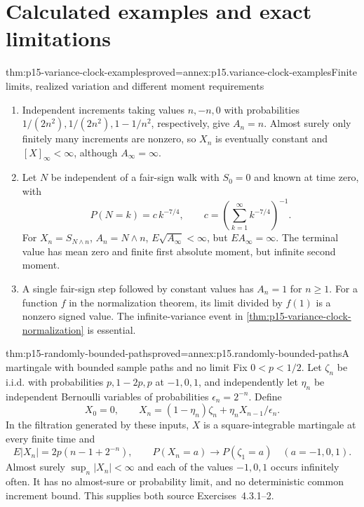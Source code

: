 \section{Calculated examples and exact limitations}
\label{sec:p15-quadratic-variation-boundaries}

\begin{hbtheorem}{thm:p15-variance-clock-examples}{proved=annex:p15.variance-clock-examples}{Finite limits, realized variation and different moment requirements}
\begin{enumerate}
\item Independent increments taking values \(n,-n,0\) with probabilities
      \(1/(2n^2),1/(2n^2),1-1/n^2\), respectively, give \(A_n=n\).
      Almost surely only finitely many increments are nonzero, so
      \(X_n\) is eventually constant and \([X]_\infty<\infty\),
      although \(A_\infty=\infty\).
\item Let \(N\) be independent of a fair-sign walk with \(S_0=0\) and known at time
      zero, with
      \[
                  P(N=k)=c\,k^{-7/4},\qquad
                  c=\left(\sum_{k=1}^\infty k^{-7/4}\right)^{-1}.
      \]
      For \(X_n=S_{N\wedge n}\), \(A_n=N\wedge n\),
      \(E\sqrt{A_\infty}<\infty\), but \(EA_\infty=\infty\).
      The terminal value has mean zero and finite first absolute
      moment, but infinite second moment.
\item A single fair-sign step followed by constant values has
      \(A_n=1\) for \(n\geq1\). For a function \(f\) in the
      normalization theorem, its limit divided by \(f(1)\)
      is a nonzero signed value. The infinite-variance event in
      \cref{thm:p15-variance-clock-normalization} is essential.
\end{enumerate}
\end{hbtheorem}

\begin{hbtheorem}{thm:p15-randomly-bounded-paths}{proved=annex:p15.randomly-bounded-paths}{A martingale with bounded sample paths and no limit}
Fix \(0<p<1/2\). Let \(\zeta_n\) be i.i.d. with probabilities
\(p,1-2p,p\) at \(-1,0,1\), and independently let
\(\eta_n\) be independent Bernoulli variables of probabilities
\(\epsilon_n=2^{-n}\). Define
\[
                   X_0=0,\qquad
                   X_n=(1-\eta_n)\zeta_n
                                +\eta_nX_{n-1}/\epsilon_n.
\]
In the filtration generated by these inputs, \(X\) is a
square-integrable martingale at every finite time and
\[
          E|X_n|=2p(n-1+2^{-n}),\qquad
          P(X_n=a)\longrightarrow P(\zeta_1=a)
                                \quad(a=-1,0,1).
\]
Almost surely \(\sup_n|X_n|<\infty\) and each of the values
\(-1,0,1\) occurs infinitely often. It has no almost-sure or
probability limit, and no deterministic common increment bound.
This supplies both source Exercises~4.3.1--2.
\end{hbtheorem}

